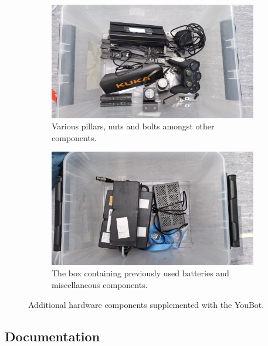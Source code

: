 \documentclass[a4paper, 12pt]{article}
\begin{document}
    
    \begin{figure}[H]
        \centering
        \begin{subfigure}[t]{0.49\linewidth}
            \centering
            \includegraphics[width=\linewidth]{images/sec2/box2.jpg}
            \caption{Various pillars, nuts and bolts amongst other components.}
        \end{subfigure}
        \hfill
        \begin{subfigure}[t]{0.49\linewidth}
            \centering
            \includegraphics[width=\linewidth]{images/sec2/box1.jpg}
            \caption{The box containing previously used batteries and miscellaneous components.}
        \end{subfigure}

        \caption{Additional hardware components supplemented with the YouBot.}
    \end{figure}

    \subsection{Documentation}
    
\end{document}
